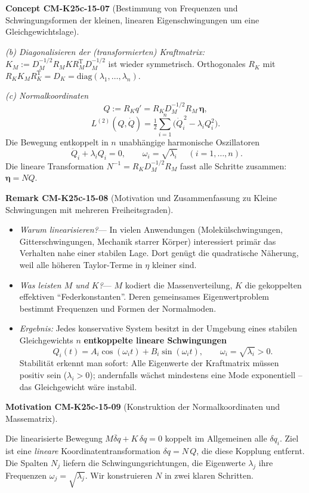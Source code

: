 \documentclass[10pt, letterpaper]{article}
\newcommand{\CustomHeading}[3]{%
  \par\medskip\noindent%
  \textbf{#1 #2} \textnormal{(#3)}.\enskip%
}
\newenvironment{REM}[2]{\CustomHeading{Remark}{#1}{#2}}{}
\newenvironment{CONC}[2]{\CustomHeading{Concept}{#1}{#2}}{}
\newenvironment{MOT}[2]{\CustomHeading{Motivation}{#1}{#2}}{}
\begin{document}
\begin{CONC}{CM-K25c-15-07}{Bestimmung von Frequenzen und Schwingungsformen der kleinen, linearen Eigen­schwingungen um eine Gleichgewichtslage}
\begin{enumerate}[label=\textbf{\arabic*.},wide=0pt,leftmargin=*]
\emph{(b) Diagonalisieren der (transformierten) Kraftmatrix:}\\
\(K_M:=D_M^{-1/2} R_M K R_M^{\mathrm T}D_M^{-1/2}\)
ist wieder symmetrisch.
Orthogonales $R_K$ mit
\(R_K K_M R_K^{\mathrm T}=D_K=\mathrm{diag}(\lambda_1,\dots,\lambda_n)\).

\emph{(c) Normalkoordinaten}\\
\[
  Q := R_K q'
  =R_K D_M^{-1/2}R_M\,\boldsymbol\eta ,
\]
\[
  L^{(2)}(Q,\dot Q)=
    \tfrac12\sum_{i=1}^{n}
      \bigl(\dot Q_i^{\,2}-\lambda_i Q_i^{2}\bigr).
\]
Die Bewegung entkoppelt in $n$ unabhängige
harmonische Oszillatoren
\[
  \boxed{\;\ddot Q_i + \lambda_i Q_i = 0,\qquad
          \omega_i=\sqrt{\lambda_i}\;}
  \quad (i=1,\dots,n).
\]
Die lineare Transformation
\(
  N^{-1}=R_K D_M^{-1/2}R_M
\)
fasst alle Schritte zusammen:
\(
  \boldsymbol\eta = N Q.
\)
\end{enumerate}
\end{CONC}

\begin{REM}{CM-K25c-15-08}{Motivation und Zusammenfassung zu Kleine Schwingungen mit mehreren Freiheitsgraden}
\begin{itemize}[leftmargin=*]
\item \emph{Warum linearisieren?}\;—
      In vielen Anwendungen (Molekülschwingungen, Gitterschwingungen,
      Mechanik starrer Körper) interessiert primär das Verhalten nahe
      einer stabilen Lage. Dort genügt die quadratische Näherung, weil
      alle höheren Taylor-Terme in \(\eta\) kleiner sind.
\item \emph{Was leisten $M$ und $K$?}\;—
      $M$ kodiert die Massenverteilung,
      $K$ die gekoppelten effektiven “Feder­konstanten”.
      Deren gemeinsames Eigenwert­problem bestimmt Frequenzen und
      Formen der Normalmoden.
\item \emph{Ergebnis:}\;
      Jedes konservative System besitzt in der Umgebung eines stabilen
      Gleichgewichts $n$ \textbf{entkoppelte lineare Schwingungen}
      \[
        Q_i(t)=A_i\cos(\omega_i t)+B_i\sin(\omega_i t),
        \qquad
        \omega_i=\sqrt{\lambda_i}>0.
      \]
      Stabilität erkennt man sofort:
      Alle Eigenwerte der Kraftmatrix müssen positiv sein
      (\(\lambda_i>0\)); andernfalls wächst mindestens eine Mode
      exponentiell – das Gleichgewicht wäre instabil.
\end{itemize}
\end{REM}

\begin{MOT}{CM-K25c-15-09}{Konstruktion der Normalkoordinaten und Massematrix}
Die linearisierte Bewegung
\(M\ddot{\delta q}+K\,\delta q=0\)
koppelt im Allgemeinen alle $\delta q_i$.
Ziel ist eine \emph{lineare} Koordinaten­transformation
\(\delta q=N\,Q\),
die diese Kopplung entfernt.  Die Spalten
\(N_j\) liefern die Schwingungsrichtungen,
die Eigenwerte \(\lambda_j\) ihre Frequenzen
\(\omega_j=\sqrt{\lambda_j}\).
Wir konstruieren $N$ in zwei klaren Schritten.
\end{MOT}
\end{document}
